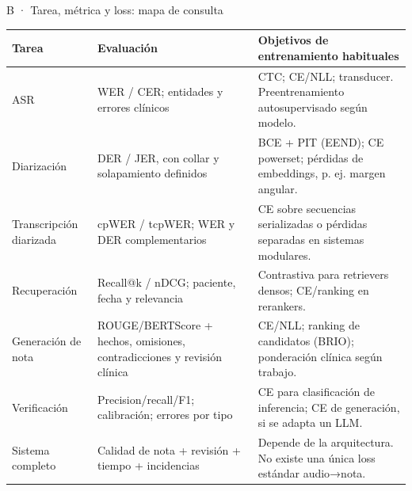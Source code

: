 \documentclass[aspectratio=169,10pt]{beamer}
\begin{document}
\begin{frame}[noframenumbering]{B · Tarea, métrica y loss: mapa de consulta}
  \vspace{1mm}
  {\fontsize{8}{10}\selectfont\renewcommand{\arraystretch}{1.05}
  \begin{tabularx}{\textwidth}{L{2.5cm}L{4.4cm}X}
    \toprule \textbf{Tarea} & \textbf{Evaluación} & \textbf{Objetivos de entrenamiento habituales}\\\midrule
    ASR & WER / CER; entidades y errores clínicos & CTC; CE/NLL; transducer. Preentrenamiento autosupervisado según modelo.\\
    Diarización & DER / JER, con collar y solapamiento definidos & BCE + PIT (EEND); CE powerset; pérdidas de embeddings, p. ej. margen angular.\\
    Transcripción diarizada & cpWER / tcpWER; WER y DER complementarios & CE sobre secuencias serializadas o pérdidas separadas en sistemas modulares.\\
    Recuperación & Recall@k / nDCG; paciente, fecha y relevancia & Contrastiva para retrievers densos; CE/ranking en rerankers.\\
    Generación de nota & ROUGE/BERTScore + hechos, omisiones, contradicciones y revisión clínica & CE/NLL; ranking de candidatos (BRIO); ponderación clínica según trabajo.\\
    Verificación & Precision/recall/F1; calibración; errores por tipo & CE para clasificación de inferencia; CE de generación, si se adapta un LLM.\\
    Sistema completo & Calidad de nota + revisión + tiempo + incidencias & Depende de la arquitectura. No existe una única loss estándar audio→nota.\\
    \bottomrule
  \end{tabularx}}
\end{frame}
\end{document}
